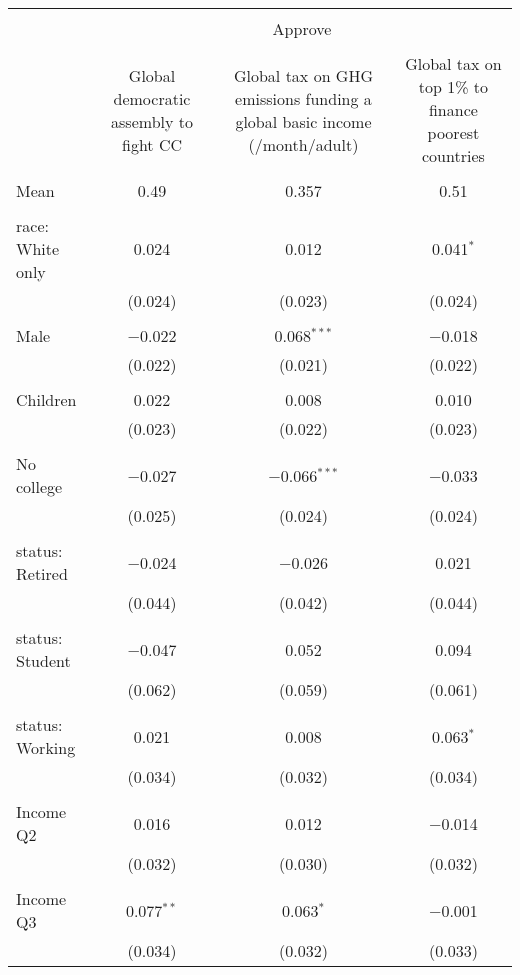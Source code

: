 
\begin{tabular}{@{\extracolsep{5pt}}lccc} 
\\[-1.8ex]\hline 
\hline \\[-1.8ex] 
 & \multicolumn{3}{c}{Approve} \\ 
\cline{2-4} 
\\[-1.8ex] & Global democratic assembly to fight CC & Global tax on GHG emissions funding a global basic income (\textdollar 30/month/adult) & Global tax on top 1\% to finance poorest countries \\ 
\hline \\[-1.8ex] 
 Mean & 0.49 & 0.357 & 0.51  \\ \hline \\[-1.8ex] race: White only & 0.024 & 0.012 & 0.041$^{*}$ \\ 
  & (0.024) & (0.023) & (0.024) \\ 
  & & & \\ 
 Male & $-$0.022 & 0.068$^{***}$ & $-$0.018 \\ 
  & (0.022) & (0.021) & (0.022) \\ 
  & & & \\ 
 Children & 0.022 & 0.008 & 0.010 \\ 
  & (0.023) & (0.022) & (0.023) \\ 
  & & & \\ 
 No college & $-$0.027 & $-$0.066$^{***}$ & $-$0.033 \\ 
  & (0.025) & (0.024) & (0.024) \\ 
  & & & \\ 
 status: Retired & $-$0.024 & $-$0.026 & 0.021 \\ 
  & (0.044) & (0.042) & (0.044) \\ 
  & & & \\ 
 status: Student & $-$0.047 & 0.052 & 0.094 \\ 
  & (0.062) & (0.059) & (0.061) \\ 
  & & & \\ 
 status: Working & 0.021 & 0.008 & 0.063$^{*}$ \\ 
  & (0.034) & (0.032) & (0.034) \\ 
  & & & \\ 
 Income Q2 & 0.016 & 0.012 & $-$0.014 \\ 
  & (0.032) & (0.030) & (0.032) \\ 
  & & & \\ 
 Income Q3 & 0.077$^{**}$ & 0.063$^{*}$ & $-$0.001 \\ 
  & (0.034) & (0.032) & (0.033) \\ 

\end{tabular}
